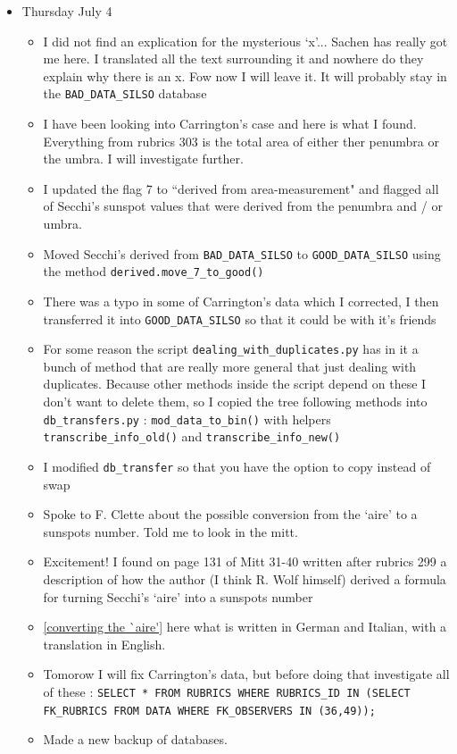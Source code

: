 \documentclass[12pt]{article}
\begin{document}
\begin{itemize}
\item Thursday July 4
    \begin{itemize}
        \item I did not find an explication for the mysterious `x'... Sachen has really got me here. I translated all the text surrounding it and nowhere do they explain why there is an x. Fow now I will leave it. It will probably stay in the \texttt{BAD\_DATA\_SILSO} database
        \item I have been looking into Carrington's case and here is what I found. Everything from rubrics 303 is the total area of either ther penumbra or the umbra. I will investigate further.
        \item I updated the flag 7 to ``derived from area-measurement" and flagged all of Secchi's sunspot values that were derived from the penumbra and / or umbra.
        \item Moved Secchi's derived from \texttt{BAD\_DATA\_SILSO} to \texttt{GOOD\_DATA\_SILSO} using the method \texttt{derived.move_7_to_good()}
        \item There was a typo in some of Carrington's data which I corrected, I then transferred it into \texttt{GOOD\_DATA\_SILSO} so that it could be with it's friends
        \item For some reason the script \texttt{dealing\_with\_duplicates.py} has in it a bunch of method that are really more general that just dealing with duplicates. Because other methods inside the script depend on these I don't want to delete them, so I copied the tree following methods into \texttt{db\_transfers.py} : \texttt{mod\_data\_to\_bin()} with helpers \texttt{transcribe\_info\_old()} and \texttt{transcribe\_info\_new()}
        \item I modified \texttt{db\_transfer} so that you have the option to copy instead of swap
        \item Spoke to F. Clette about the possible conversion from the `aire' to a sunspots number. Told me to look in the mitt.
        \item Excitement! I found on page 131 of Mitt 31-40 written after rubrics 299 a description of how the author (I think R. Wolf himself) derived a formula for turning Secchi's `aire' into a sunspots number
        \item \ref{converting the `aire'} here what is written in German and Italian, with a translation in English.
        \item Tomorow I will fix Carrington's data, but before doing that investigate all of these : \texttt{SELECT * FROM RUBRICS WHERE RUBRICS_ID IN (SELECT FK_RUBRICS FROM DATA WHERE FK_OBSERVERS IN (36,49));}
        \item Made a new backup of databases.
    \end{itemize}
    
    
\end{itemize}
\end{document}
